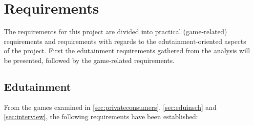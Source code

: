 \section{Requirements}
\label{sec:requirements}

The requirements for this project are divided into practical (game-related) requirements and requirements with regards to the edutainment-oriented aspects of the project.
First the edutainment requirements gathered from the analysis will be presented, followed by the game-related requirements.

\subsection{Edutainment}

From the games examined in \autoref{sec:privateconsumers}, \autoref{sec:eduinsch} and \autoref{sec:interview}, the following requirements have been established: 

